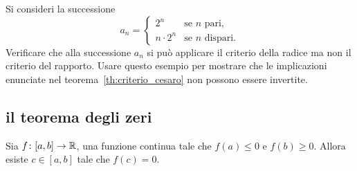  \begin{exercise}
 Si consideri la successione
 \[
 a_n =
 \begin{cases}
    2^n &\text{se $n$ pari},\\
    n\cdot 2^n &\text{se $n$ dispari}.
 \end{cases}
 \]
 Verificare che alla successione $a_n$
  si può applicare il criterio della radice ma
  non il criterio del rapporto.
  Usare questo esempio per mostrare che le implicazioni
  enunciate nel teorema~\ref{th:criterio_cesaro} non
  possono essere invertite.
  \end{exercise}  

\subsection{il teorema degli zeri}

\begin{theorem}
\mymark{***}%
%
%
\label{th:zeri}%
Sia $f\colon[a,b] \to {\mathbb R}$, una funzione
continua tale che $f(a)\le 0$ e $f(b)\ge 0$.
Allora esiste
 $c\in [a,b]$ tale che $f(c)=0$.
\end{theorem}

